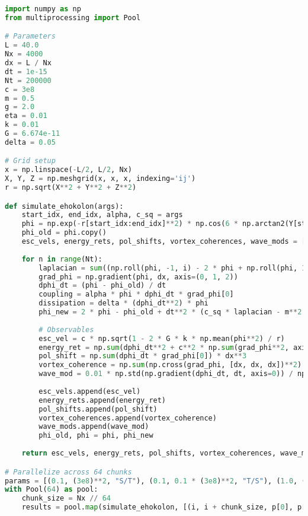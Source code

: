 \documentclass[11pt]{article}
\begin{document}
\begin{lstlisting}[language=Python, caption={Fluxonic Black Hole and Event Horizon Simulation}, label=lst:simulation]
import numpy as np
from multiprocessing import Pool

# Parameters
L = 40.0
Nx = 4000
dx = L / Nx
dt = 1e-15
Nt = 200000
c = 3e8
m = 0.5
g = 2.0
eta = 0.01
k = 0.01
G = 6.674e-11
delta = 0.05

# Grid setup
x = np.linspace(-L/2, L/2, Nx)
X, Y, Z = np.meshgrid(x, x, x, indexing='ij')
r = np.sqrt(X**2 + Y**2 + Z**2)

def simulate_ehokolon(args):
    start_idx, end_idx, alpha, c_sq = args
    phi = np.exp(-r[start_idx:end_idx]**2) * np.cos(6 * np.arctan2(Y[start_idx:end_idx], X[start_idx:end_idx])) + 0.1 * np.random.rand(Nx//64, Nx, Nx)
    phi_old = phi.copy()
    esc_vels, energy_rets, pol_shifts, vortex_coherences, wave_mods = [], [], [], [], []
    
    for n in range(Nt):
        laplacian = sum((np.roll(phi, -1, i) - 2 * phi + np.roll(phi, 1, i)) / dx**2 for i in range(3))
        grad_phi = np.gradient(phi, dx, axis=(0, 1, 2))
        dphi_dt = (phi - phi_old) / dt
        coupling = alpha * phi * dphi_dt * grad_phi[0]
        dissipation = delta * (dphi_dt**2) * phi
        phi_new = 2 * phi - phi_old + dt**2 * (c_sq * laplacian - m**2 * phi - g * phi**3 - eta * phi**5 + coupling - dissipation)
        
        # Observables
        esc_vel = c * np.sqrt(1 - 2 * G * k * np.mean(phi**2) / r)
        energy_ret = np.sum(dphi_dt**2 + c**2 * np.sum(grad_phi**2, axis=0)) * dx**3
        pol_shift = np.sum(dphi_dt * grad_phi[0]) * dx**3
        vortex_coherence = np.sum(np.cross(grad_phi, [dx, dx, dx])**2) / np.sum(grad_phi**2) * dx**3
        wave_mod = 0.01 * np.std(np.gradient(dphi_dt, dt, axis=0)) / np.mean(np.gradient(dphi_dt, dt, axis=0))
        
        esc_vels.append(esc_vel)
        energy_rets.append(energy_ret)
        pol_shifts.append(pol_shift)
        vortex_coherences.append(vortex_coherence)
        wave_mods.append(wave_mod)
        phi_old, phi = phi, phi_new
    
    return esc_vels, energy_rets, pol_shifts, vortex_coherences, wave_mods

# Parallelize across 64 chunks
params = [(0.1, (3e8)**2, "S/T"), (0.1, 0.1 * (3e8)**2, "T/S"), (1.0, (3e8)**2, "S=T")]
with Pool(64) as pool:
    chunk_size = Nx // 64
    results = pool.map(simulate_ehokolon, [(i, i + chunk_size, p[0], p[1]) for i in range(0, Nx, chunk_size) for p in params])
\end{lstlisting}
\end{document}
